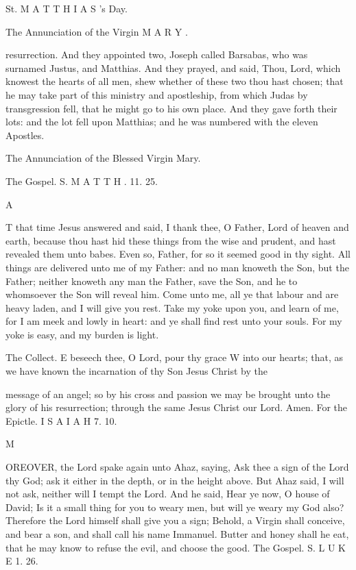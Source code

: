 St. M A T T H I A S ’s Day.

The Annunciation of the Virgin M A R Y .

resurrection. And they appointed two, Joseph called Barsabas, who was surnamed Justus, and Matthias. And they prayed, and said, Thou, Lord, which knowest the hearts of all men, shew whether of these two thou hast chosen; that he may take part of this ministry and apostleship, from which Judas by transgression fell, that he might go to his own place. And they gave forth their lots: and the lot fell upon Matthias; and he was numbered with the eleven Apostles.

The Annunciation of the Blessed Virgin Mary.

The Gospel. S. M A T T H . 11. 25.

A

T that time Jesus answered and said, I thank thee, O Father, Lord of heaven and earth, because thou hast hid these things from the wise and prudent, and hast revealed them unto babes. Even so, Father, for so it seemed good in thy sight. All things are delivered unto me of my Father: and no man knoweth the Son, but the Father; neither knoweth any man the Father, save the Son, and he to whomsoever the Son will reveal him. Come unto me, all ye that labour and are heavy laden, and I will give you rest. Take my yoke upon you, and learn of me, for I am meek and lowly in heart: and ye shall find rest unto your souls. For my yoke is easy, and my burden is light.

The Collect. E beseech thee, O Lord, pour thy grace W into our hearts; that, as we have known the incarnation of thy Son Jesus Christ by the

message of an angel; so by his cross and passion we may be brought unto the glory of his resurrection; through the same Jesus Christ our Lord. Amen. For the Epictle. I S A I A H 7. 10.

M

OREOVER, the Lord spake again unto Ahaz, saying, Ask thee a sign of the Lord thy God; ask it either in the depth, or in the height above. But Ahaz said, I will not ask, neither will I tempt the Lord. And he said, Hear ye now, O house of David; Is it a small thing for you to weary men, but will ye weary my God also? Therefore the Lord himself shall give you a sign; Behold, a Virgin shall conceive, and bear a son, and shall call his name Immanuel. Butter and honey shall he eat, that he may know to refuse the evil, and choose the good. The Gospel. S. L U K E 1. 26.

